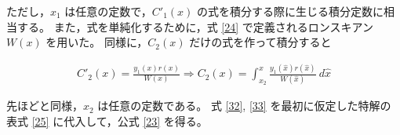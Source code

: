 ただし，$x_1$ は任意の定数で，$C'_1(x)$ の式を積分する際に生じる積分定数に相当する。
また，式を単純化するために，式 \eqref{24} で定義されるロンスキアン $W(x)$ を用いた。
同様に，$C_2(x)$ だけの式を作って積分すると

\begin{gather}
  C'_2(x) = \frac{y_1(x)r(x)}{W(x)}
  \Rightarrow C_2(x) =
  \int_{x_2}^{x}\frac{y_1(\hat{x})r(\hat{x})}{W(\hat{x})}\:d\hat{x} \label{33}
\end{gather}

先ほどと同様，$x_2$ は任意の定数である。
式 \eqref{32}, \eqref{33} を最初に仮定した特解の表式 \eqref{25} に代入して，公式 \eqref{23} を得る。
